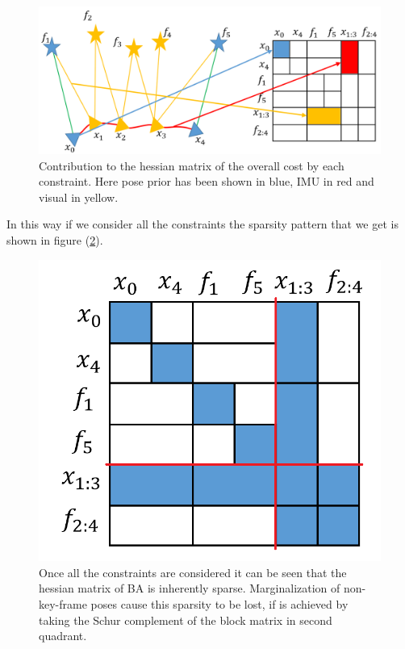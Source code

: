 \begin{figure}[ht]
	\centering
		\includegraphics[width=1.00\textwidth]{images/HessianSparsity.png}
  \caption{Contribution to the hessian matrix of the overall cost by each constraint. Here pose prior has been shown in blue, IMU in red and visual in yellow.}
  \label{fig:HessianSparsity}
\end{figure}

In this way if we consider all the constraints the sparsity pattern that we get is shown in figure (\ref{fig:HessianSparsityAllFillUp}).

\begin{figure}[ht]
	\centering
		\includegraphics[width=1.00\textwidth]{images/HessianSparsityAllFillUp.png}
  \caption{Once all the constraints are considered it can be seen that the hessian matrix of BA is inherently sparse. Marginalization of non-key-frame poses cause this sparsity to be lost, if is achieved by taking the Schur complement of the block matrix in second quadrant.}
  \label{fig:HessianSparsityAllFillUp}
\end{figure}

